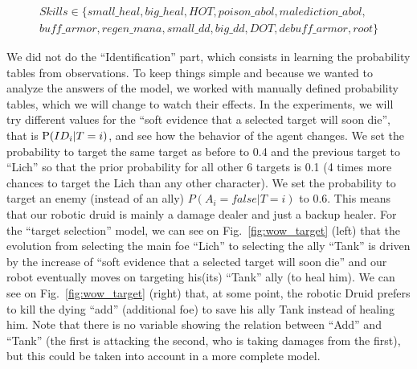\begin{eqnarray*}
Skills \in \{ small\_heal, big\_heal, HOT, poison\_abol, malediction\_abol,\\
            buff\_armor, regen\_mana, small\_dd, big\_dd, DOT, debuff\_armor, root \}
\end{eqnarray*}

We did not do the ``Identification'' part, which consists in learning the probability tables from observations. To keep things simple and because we wanted to analyze the answers of the model, we worked with manually defined probability tables, %
which we will change to watch their effects. 
In the experiments, we will try different values for the ``soft evidence that a selected target will soon die'', that is $\mathrm{P}(ID_i | T=i)$, and see how the behavior of the agent changes. 
We set the probability to target the same target as before to 0.4 and the previous target to ``Lich'' so that the prior probability for all other 6 targets is 0.1 (4 times more chances to target the Lich than any other character). 
We set the probability to target an enemy (instead of an ally) $P(A_i=false|T=i)$ to 0.6. This means that our robotic druid is mainly a damage dealer and just a backup healer. For the ``target selection'' model, we can see on Fig.~\ref{fig:wow_target} (left) that the evolution from selecting the main foe ``Lich'' to selecting the ally ``Tank'' is driven by the increase of 
``soft evidence that a selected target will soon die'' and our robot eventually moves on targeting his(its) ``Tank'' ally (to heal him). We can see on Fig.~\ref{fig:wow_target} (right) that, at some point, the robotic Druid prefers to kill the dying ``add'' (additional foe) to save his ally Tank instead of healing him. Note that there is no variable showing the relation between ``Add'' and ``Tank'' (the first is attacking the second, who is taking damages from the first), but this could be taken into account in a more complete model.

